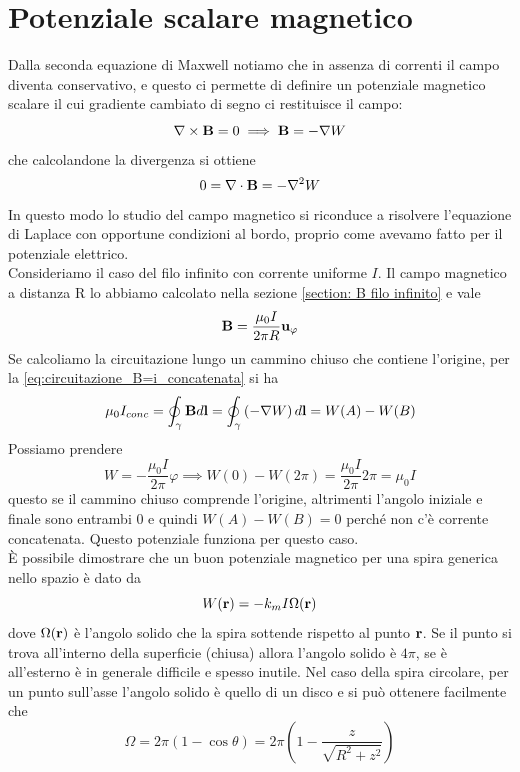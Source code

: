 \section{Potenziale scalare magnetico}
Dalla seconda equazione di Maxwell notiamo che in assenza di correnti il campo diventa conservativo, e questo ci permette di definire un potenziale 
magnetico scalare il cui gradiente cambiato di segno ci restituisce il campo:
\begin{equation}
  \mathbf{\nabla}\times\mathbf{ B } = 0 \implies \mathbf{ B } = - \nabla W
\end{equation}
che calcolandone la divergenza si ottiene
\begin{equation}
  0 = \nabla\cdot\mathbf{ B } = - \nabla^2 W
\end{equation}
In questo modo lo studio del campo magnetico si riconduce a risolvere l'equazione di Laplace con opportune condizioni al bordo, 
proprio come avevamo fatto per il potenziale elettrico.\\
Consideriamo il caso del filo infinito con corrente uniforme $ I $. Il campo magnetico a distanza R lo abbiamo calcolato nella sezione 
\eqref{section: B filo infinito}
e vale
\begin{equation}
  \mathbf{ B } = \frac{\mu_0 I}{2\pi R} \mathbf{ u }_{\varphi} 
\end{equation}
Se calcoliamo la circuitazione lungo un cammino chiuso che contiene l'origine, per la \eqref{eq:circuitazione_B=i_concatenata} si ha
\begin{equation}
  \mu_0 I_{conc} = \oint_{\gamma} \mathbf{ B } d\mathbf{ l } = \oint_{\gamma} \left( -\nabla W \right) d\mathbf{ l } = W(A) - W(B)
\end{equation}
Possiamo prendere
\begin{equation}
  W = - \frac{\mu_0 I}{2\pi} \varphi \implies W(0) - W(2\pi) = \frac{\mu_0 I}{2\pi} 2\pi = \mu_0 I
\end{equation}
questo se il cammino chiuso comprende l'origine, altrimenti l'angolo iniziale e finale sono entrambi $ 0 $ e quindi $ W(A) - W(B) = 0 $ 
perché non c'è corrente concatenata. Questo potenziale funziona per questo caso.\\
È possibile dimostrare che un buon potenziale magnetico per una spira generica nello spazio è dato da
\begin{equation}
  W(\mathbf{ r }) = - k_m I \Omega (\mathbf{ r })
\end{equation}
dove $ \Omega (\mathbf{ r }) $ è l'angolo solido che la spira sottende rispetto al punto $ \mathbf{ r } $. Se il punto si trova all'interno della 
superficie (chiusa) allora l'angolo solido è $ 4\pi $, se è all'esterno è in generale difficile e spesso inutile. Nel caso della spira circolare, per un punto 
sull'asse l'angolo solido è quello di un disco e si può ottenere facilmente che
\begin{equation}
  \Omega = 2\pi (1 - \cos \theta) = 2\pi \left( 1 - \frac{z}{\sqrt{R^2 + z^2}} \right)
\end{equation}


